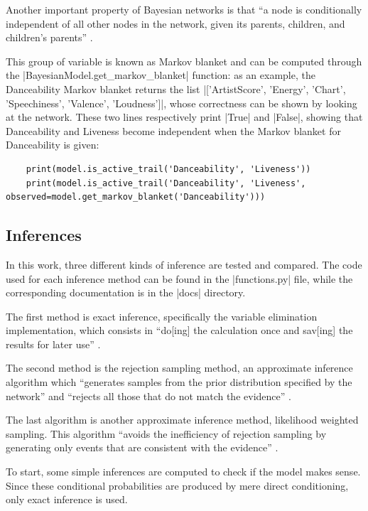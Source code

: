\documentclass[a4paper, 12pt]{article}
\begin{document}
Another important property of Bayesian networks is that ``a node is conditionally independent of all other nodes in the network, given its parents, children, and children’s parents'' \cite{probabilistic-reasoning}.

This group of variable is known as Markov blanket and can be computed through the \spverb|BayesianModel.get_markov_blanket| function: as an example, the Danceability Markov blanket returns the list \spverb|['ArtistScore', 'Energy', 'Chart', 'Speechiness', 'Valence', 'Loudness']|, whose correctness can be shown by looking at the network. These two lines respectively print \spverb|True| and \spverb|False|, showing that Danceability and Liveness become independent when the Markov blanket for Danceability is given:
\begin{verbatim}
    print(model.is_active_trail('Danceability', 'Liveness'))
    print(model.is_active_trail('Danceability', 'Liveness', observed=model.get_markov_blanket('Danceability')))
\end{verbatim}


\subsection{Inferences}

In this work, three different kinds of inference are tested and compared. The code used for each inference method can be found in the \spverb|functions.py| file, while the corresponding documentation is in the \spverb|docs| directory.

The first method is exact inference, specifically the variable elimination implementation, which consists in ``do[ing] the calculation once and sav[ing] the results for later use'' \cite{probabilistic-reasoning}.

The second method is the rejection sampling method, an approximate inference algorithm which ``generates samples from the prior distribution specified by the network'' \cite{probabilistic-reasoning} and ``rejects all those that do not match the evidence'' \cite{probabilistic-reasoning}.

The last algorithm is another approximate inference method, likelihood weighted sampling. This algorithm ``avoids the inefficiency of rejection sampling by generating only events that are consistent with the evidence'' \cite{probabilistic-reasoning}.

To start, some simple inferences are computed to check if the model makes sense. Since these conditional probabilities are produced by mere direct conditioning, only exact inference is used.
\end{document}
